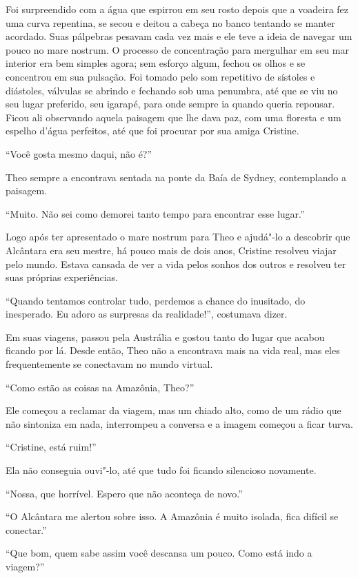 Foi surpreendido com a água que espirrou em seu rosto depois que a
voadeira fez uma curva repentina, se secou e deitou a cabeça no banco
tentando se manter acordado. Suas pálpebras pesavam cada vez mais e ele
teve a ideia de navegar um pouco no mare nostrum. O processo de
concentração para mergulhar em seu mar interior era bem simples agora;
sem esforço algum, fechou os olhos e se concentrou em sua pulsação. Foi
tomado pelo som repetitivo de sístoles e diástoles, válvulas se abrindo
e fechando sob uma penumbra, até que se viu no seu lugar preferido, seu
igarapé, para onde sempre ia quando queria repousar. Ficou ali
observando aquela paisagem que lhe dava paz, com uma floresta e um
espelho d'água perfeitos, até que foi procurar por sua amiga Cristine.

``Você gosta mesmo daqui, não é?''

Theo sempre a encontrava sentada na ponte da Baía de Sydney,
contemplando a paisagem.

``Muito. Não sei como demorei tanto tempo para encontrar esse lugar.''

Logo após ter apresentado o mare nostrum para Theo e ajudá"-lo a
descobrir que Alcântara era seu mestre, há pouco mais de dois anos,
Cristine resolveu viajar pelo mundo. Estava cansada de ver a vida
pelos sonhos dos outros e resolveu ter suas próprias experiências.

``Quando tentamos controlar tudo, perdemos a chance do inusitado, do
inesperado. Eu adoro as surpresas da realidade!'', costumava dizer.

Em suas viagens, passou pela Austrália e gostou tanto do lugar que
acabou ficando por lá. Desde então, Theo não a encontrava mais na vida
real, mas eles frequentemente se conectavam no mundo virtual.

``Como estão as coisas na Amazônia, Theo?''

Ele começou a reclamar da viagem, mas um chiado alto, como de um rádio
que não sintoniza em nada, interrompeu a conversa e a imagem começou a
ficar turva.

``Cristine, está ruim!''

Ela não conseguia ouvi"-lo, até que tudo foi ficando silencioso novamente.

``Nossa, que horrível. Espero que não aconteça de novo.''

``O Alcântara me alertou sobre isso. A Amazônia é muito isolada, fica
difícil se conectar.''

``Que bom, quem sabe assim você descansa um pouco. Como está indo a
viagem?''

